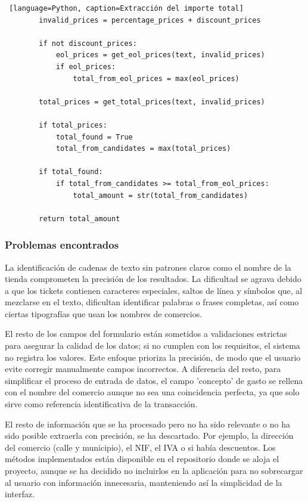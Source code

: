 \begin{itemize}
\begin{lstlisting} [language=Python, caption=Extracción del importe total]
        invalid_prices = percentage_prices + discount_prices

        if not discount_prices:
            eol_prices = get_eol_prices(text, invalid_prices)         
            if eol_prices:
                total_from_eol_prices = max(eol_prices)
        
        total_prices = get_total_prices(text, invalid_prices)

        if total_prices:
            total_found = True
            total_from_candidates = max(total_prices)      
        
        if total_found:
            if total_from_candidates >= total_from_eol_prices:
                total_amount = str(total_from_candidates)

        return total_amount
    \end{lstlisting}
\end{itemize}


\subsubsection{Problemas encontrados}
La identificación de cadenas de texto sin patrones claros como el nombre de la tienda comprometen la precisión de los resultados. La dificultad se agrava debido a que los tickets contienen caracteres especiales, saltos de línea y símbolos que, al mezclarse en el texto, dificultan identificar palabras o frases completas, así como ciertas tipografías que usan los nombres de comercios. 

El resto de los campos del formulario están sometidos a validaciones estrictas para asegurar la calidad de los datos; si no cumplen con los requisitos, el sistema no registra los valores. Este enfoque prioriza la precisión, de modo que el usuario evite corregir manualmente campos incorrectos. A diferencia del resto, para simplificar el proceso de entrada de datos, el campo 'concepto' de gasto se rellena con el nombre del comercio aunque no sea una coincidencia perfecta, ya que solo sirve como referencia identificativa de la transacción.

El resto de información que se ha procesado pero no ha sido relevante o no ha sido posible extraerla con precisión, se ha descartado. Por ejemplo, la dirección del comercio (calle y municipio), el NIF, el IVA o si había descuentos. Los métodos implementados están disponible en el repositorio donde se aloja el proyecto, aunque se ha decidido no incluirlos en la aplicación para no sobrecargar al usuario con información innecesaria, manteniendo así la simplicidad de la interfaz.


